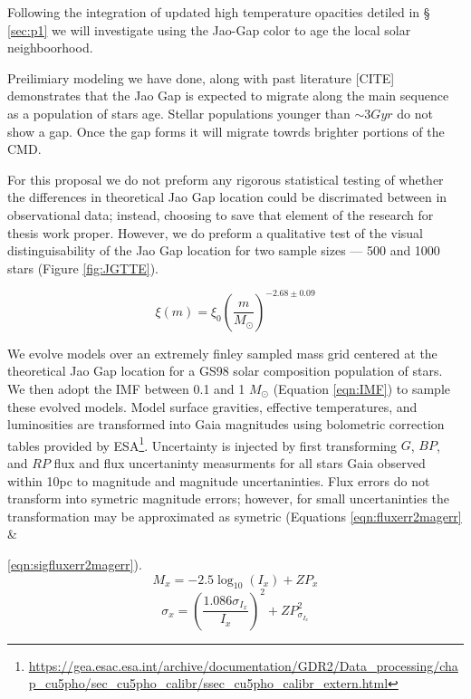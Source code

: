 Following the integration of updated high temperature opacities detiled in \S
\ref{sec:p1} we will investigate using the Jao-Gap color to age the local
solar neighboorhood.

Preilimiary modeling we have done, along with past literature [CITE]
demonstrates that the Jao Gap is expected to migrate along the main sequence as
a population of stars age. Stellar populations younger than $\sim 3 Gyr$ do not
show a gap. Once the gap forms it will migrate towrds brighter portions of the
CMD.

For this proposal we do not preform any rigorous statistical testing of whether
the differences in theoretical Jao Gap location could be discrimated between in
observational data; instead, choosing to save that element of the research for
thesis work proper. However, we do preform a qualitative test of the visual
distinguisability of the Jao Gap location for two sample sizes --- 500 and 1000
stars (Figure \ref{fig:JGTTE}).

\begin{equation}\label{eqn:IMF}
	\xi(m) = \xi_{0}\left(\frac{m}{M_{\odot}}\right)^{-2.68\pm0.09}
\end{equation}

We evolve models over an extremely finley sampled mass grid centered at the
theoretical Jao Gap location for a GS98 solar composition population of stars.
We then adopt the \citep{Sollima2019} IMF between 0.1 and 1 $M_{\odot}$
(Equation \ref{eqn:IMF}) to sample these evolved models. Model surface
gravities, effective temperatures, and luminosities are transformed into Gaia
magnitudes using bolometric correction tables provided by ESA\footnote{\url{https://gea.esac.esa.int/archive/documentation/GDR2/Data\_processing/chap\_cu5pho/sec\_cu5pho\_calibr/ssec\_cu5pho\_calibr\_extern.html}}. Uncertainty is injected by first transforming $G$, $BP$, and $RP$ flux
and flux uncertaninty measurments for all stars Gaia observed within 10pc to
magnitude and magnitude uncertaninties. Flux errors do not transform into
symetric magnitude errors; however, for small uncertaninties the transformation
may be approximated as symetric (Equations \ref{eqn:fluxerr2magerr} \&

\ref{eqn:sigfluxerr2magerr}).
\begin{equation}\label{eqn:fluxerr2magerr}
	M_{x} = -2.5\log_{10}(I_{x}) + ZP_{x}
\end{equation}
\begin{equation}\label{eqn:sigfluxerr2magerr}
	\sigma_{x} = \left(\frac{1.086\sigma_{I_{x}}}{I_{x}}\right)^{2} + ZP_{\sigma_{I_{x}}}^{2}
\end{equation}

